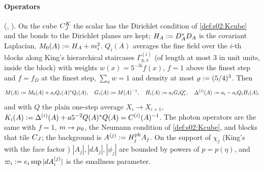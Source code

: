 \paragraph{Operators} (\cite[(2.10)--(2.17)]{K1}, \cite[(3.2)]{K2}). On the cube $C^{K}_{J}$ the scalar has the Dirichlet condition of \cref{def:s02:Kcube} and the bonds to the Dirichlet planes are kept; $H_A:= D_A^*D_A$ is the covariant Laplacian, $M_0(A):= H_A+m_i^2$. $Q_i(A)$ averages the fine field over the $i$-th blocks along King's hierarchical staircases $\Gamma^{(i)}_{y,x}$ (of length at most $3$ in unit units, inside the block) with weights $w(x)=5^{-3i}f(x)$, $f=1$ above the finest step and $f=f_D$ at the finest step, $\sum_xw=1$ and density at most $\varrho:=(5/4)^3$. Then
\[
M(A):= M_0(A)+a_iQ_i(A)^*Q_i(A),\quad G_i(A):= M(A)^{-1},\quad H_i(A):= a_iG_iQ_i^*,\quad \Delta^{(i)}(A):= a_i-a_iQ_iH_i(A),
\]
and with $Q$ the plain one-step average $X_i\to X_{i+1}$, $K_i(A):=\Delta^{(i)}(A)+a5^{-2}Q(A)^*Q(A)=C^{(i)}(A)^{-1}$. The photon operators are the same with $f=1$, $m\to\mu_0$, the Neumann condition of \cref{def:s02:Kcube}, and blocks that tile $C_J$; the background is $A^{(j)}:= H^{\mathrm{ph}}_jA_j$. On the support of $\chi_j$ (King's \cite[(3.2)]{K1} with the face factor \cite[(5.41)]{K2}) $|A_j|,|dA_j|,|\phi_j|$ are bounded by powers of $p=p(\eta)$, and $\varpi_i:= e_i\sup|dA^{(j)}_i|$ is the smallness parameter.

